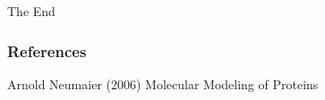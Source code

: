 \documentclass{beamer}
\begin{document}

\begin{frame}
\Huge{\centerline{The End}}
\end{frame}


\begin{frame}
\frametitle{References}
\footnotesize{
\begin{thebibliography}{99} %
 Arnold Neumaier (2006)
\newblock Molecular Modeling of Proteins
\end{thebibliography}
}
\end{frame}

\end{document}
